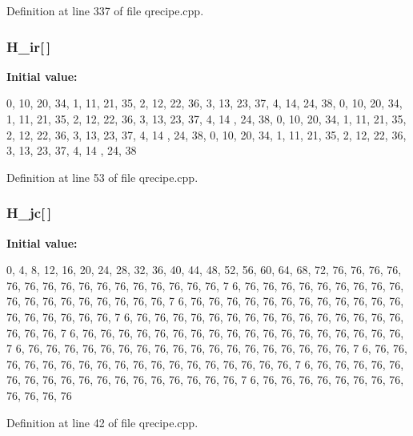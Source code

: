 Definition at line 337 of file qrecipe.cpp.

\subsubsection[{H\_\-ir}]{ {\bf H\_\-ir}[$\,$]}\label{qrecipe_8cpp_a0c4453307b17cb5b194ed25af899402d}
{\bfseries Initial value:}
\begin{DoxyCode}
 {0, 10, 20, 34, 1, 11, 21, 35, 2, 12, 22, 36, 3, 13, 23, 37, 4, 14,
        24, 38, 0, 10, 20, 34, 1, 11, 21, 35, 2, 12, 22, 36, 3, 13, 23, 37, 4, 14
      ,
        24, 38, 0, 10, 20, 34, 1, 11, 21, 35, 2, 12, 22, 36, 3, 13, 23, 37, 4, 14
      ,
        24, 38, 0, 10, 20, 34, 1, 11, 21, 35, 2, 12, 22, 36, 3, 13, 23, 37, 4, 14
      ,
        24, 38}
\end{DoxyCode}


Definition at line 53 of file qrecipe.cpp.

\subsubsection[{H\_\-jc}]{ {\bf H\_\-jc}[$\,$]}\label{qrecipe_8cpp_a9008dd7c67da8c922a573332be31759a}
{\bfseries Initial value:}
\begin{DoxyCode}
 {0, 4, 8, 12, 16, 20, 24, 28, 32, 36, 40, 44, 48, 52, 56, 60, 64,
        68, 72, 76, 76, 76, 76, 76, 76, 76, 76, 76, 76, 76, 76, 76, 76, 76, 76, 7
      6,
        76, 76, 76, 76, 76, 76, 76, 76, 76, 76, 76, 76, 76, 76, 76, 76, 76, 76, 7
      6,
        76, 76, 76, 76, 76, 76, 76, 76, 76, 76, 76, 76, 76, 76, 76, 76, 76, 76, 7
      6,
        76, 76, 76, 76, 76, 76, 76, 76, 76, 76, 76, 76, 76, 76, 76, 76, 76, 76, 7
      6,
        76, 76, 76, 76, 76, 76, 76, 76, 76, 76, 76, 76, 76, 76, 76, 76, 76, 76, 7
      6,
        76, 76, 76, 76, 76, 76, 76, 76, 76, 76, 76, 76, 76, 76, 76, 76, 76, 76, 7
      6,
        76, 76, 76, 76, 76, 76, 76, 76, 76, 76, 76, 76, 76, 76, 76, 76, 76, 76, 7
      6,
        76, 76, 76, 76, 76, 76, 76, 76, 76, 76, 76, 76, 76, 76, 76, 76, 76, 76, 7
      6,
        76, 76, 76, 76, 76, 76, 76, 76, 76, 76, 76, 76}
\end{DoxyCode}


Definition at line 42 of file qrecipe.cpp.

